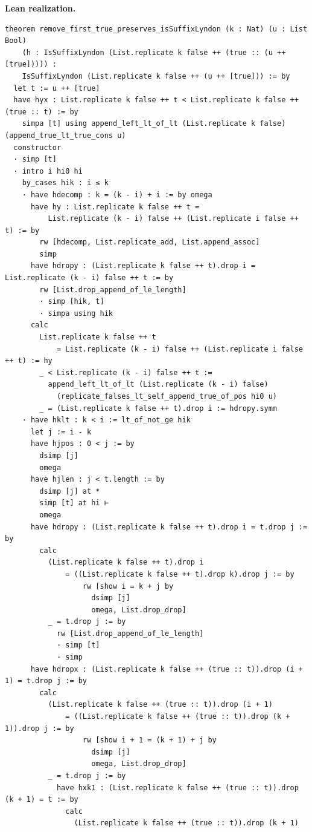 \documentclass[11pt]{article}
\theoremstyle{definition}
\theoremstyle{remark}
\newenvironment{leanbridge}{%
  \par\smallskip\noindent\textbf{Lean realization.}\par\smallskip%
}{%
  \par\smallskip%
}
\begin{document}
\begin{leanbridge}
\begin{lstlisting}
theorem remove_first_true_preserves_isSuffixLyndon (k : Nat) (u : List Bool)
    (h : IsSuffixLyndon (List.replicate k false ++ (true :: (u ++ [true])))) :
    IsSuffixLyndon (List.replicate k false ++ (u ++ [true])) := by
  let t := u ++ [true]
  have hyx : List.replicate k false ++ t < List.replicate k false ++ (true :: t) := by
    simpa [t] using append_left_lt_of_lt (List.replicate k false) (append_true_lt_true_cons u)
  constructor
  · simp [t]
  · intro i hi0 hi
    by_cases hik : i ≤ k
    · have hdecomp : k = (k - i) + i := by omega
      have hy : List.replicate k false ++ t =
          List.replicate (k - i) false ++ (List.replicate i false ++ t) := by
        rw [hdecomp, List.replicate_add, List.append_assoc]
        simp
      have hdropy : (List.replicate k false ++ t).drop i = List.replicate (k - i) false ++ t := by
        rw [List.drop_append_of_le_length]
        · simp [hik, t]
        · simpa using hik
      calc
        List.replicate k false ++ t
            = List.replicate (k - i) false ++ (List.replicate i false ++ t) := hy
        _ < List.replicate (k - i) false ++ t :=
          append_left_lt_of_lt (List.replicate (k - i) false)
            (replicate_falses_lt_self_append_true_of_pos hi0 u)
        _ = (List.replicate k false ++ t).drop i := hdropy.symm
    · have hklt : k < i := lt_of_not_ge hik
      let j := i - k
      have hjpos : 0 < j := by
        dsimp [j]
        omega
      have hjlen : j < t.length := by
        dsimp [j] at *
        simp [t] at hi ⊢
        omega
      have hdropy : (List.replicate k false ++ t).drop i = t.drop j := by
        calc
          (List.replicate k false ++ t).drop i
              = ((List.replicate k false ++ t).drop k).drop j := by
                  rw [show i = k + j by
                    dsimp [j]
                    omega, List.drop_drop]
          _ = t.drop j := by
            rw [List.drop_append_of_le_length]
            · simp [t]
            · simp
      have hdropx : (List.replicate k false ++ (true :: t)).drop (i + 1) = t.drop j := by
        calc
          (List.replicate k false ++ (true :: t)).drop (i + 1)
              = ((List.replicate k false ++ (true :: t)).drop (k + 1)).drop j := by
                  rw [show i + 1 = (k + 1) + j by
                    dsimp [j]
                    omega, List.drop_drop]
          _ = t.drop j := by
            have hxk1 : (List.replicate k false ++ (true :: t)).drop (k + 1) = t := by
              calc
                (List.replicate k false ++ (true :: t)).drop (k + 1)

\end{lstlisting}
\end{leanbridge}
\end{document}
